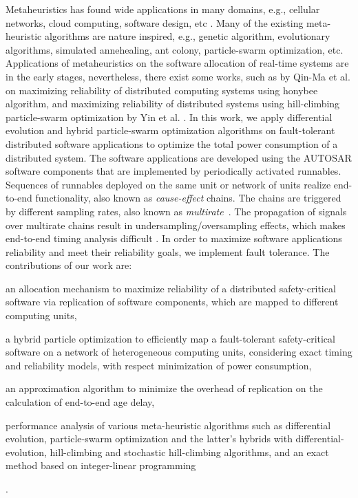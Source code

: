 Metaheuristics has found wide applications in many domains, e.g.,  cellular networks, cloud computing, software design, etc \cite{2006HandbookMetaheuristics}. Many of the existing meta-heuristic algorithms are nature inspired, e.g., genetic algorithm, evolutionary algorithms, simulated annehealing, ant colony, particle-swarm optimization, etc. Applications of metaheuristics on the software allocation of real-time systems are in the early stages, nevertheless, there exist some works, such as by Qin-Ma et al. \cite{kartik1997task} on maximizing reliability of distributed computing systems using honybee algorithm, and maximizing reliability of distributed systems using hill-climbing particle-swarm optimization by Yin et al. \cite{yin2007task}. In this work, we apply differential evolution and hybrid particle-swarm optimization algorithms on fault-tolerant distributed software applications to optimize the total power consumption of a distributed system. The software applications are developed using the AUTOSAR software components that are implemented by periodically activated runnables. Sequences of runnables deployed on the same unit or network of units realize end-to-end functionality, also known as \textit{cause-effect} chains. The chains are triggered by different sampling rates, also known as  \textit{multirate}~\cite{Vinet2010APolynomials}. The propagation of signals over multirate chains result in undersampling/oversampling effects, which makes end-to-end timing analysis difficult \cite{mubeen2013support}. In order to maximize software applications reliability and meet their reliability goals, we implement fault tolerance. 
The contributions of our work are: 
\begin{enumerate*}[label=(\roman*)]
	\item an allocation mechanism to maximize reliability of a distributed safety-critical software via replication of software components, which are mapped to different computing units,
	\item a hybrid particle optimization to efficiently map a fault-tolerant safety-critical software on a network of heterogeneous computing units, considering exact timing and reliability models, with respect minimization of power consumption,
	\item an approximation algorithm to minimize the overhead of replication on the calculation of end-to-end age delay,
	\item performance analysis of various meta-heuristic algorithms such as differential evolution, particle-swarm optimization and the latter's hybrids with differential-evolution, hill-climbing and stochastic hill-climbing algorithms, and an exact method based on integer-linear programming
\end{enumerate*}. 

